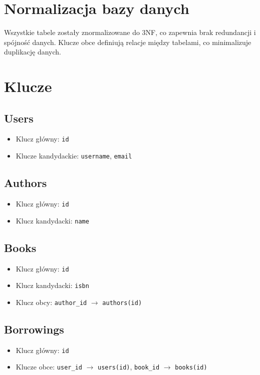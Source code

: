 \documentclass{article}
\begin{document}
\section*{Normalizacja bazy danych}
Wszystkie tabele zostały znormalizowane do 3NF, co zapewnia brak redundancji i spójność danych. Klucze obce definiują relacje między tabelami, co minimalizuje duplikację danych.

\section*{Klucze}
\subsection*{Users}
\begin{itemize}
    \item Klucz główny: \texttt{id}
    \item Klucze kandydackie: \texttt{username}, \texttt{email}
\end{itemize}

\subsection*{Authors}
\begin{itemize}
    \item Klucz główny: \texttt{id}
    \item Klucz kandydacki: \texttt{name}
\end{itemize}

\subsection*{Books}
\begin{itemize}
    \item Klucz główny: \texttt{id}
    \item Klucz kandydacki: \texttt{isbn}
    \item Klucz obcy: \texttt{author\_id} \(\rightarrow\) \texttt{authors(id)}
\end{itemize}

\subsection*{Borrowings}
\begin{itemize}
    \item Klucz główny: \texttt{id}
    \item Klucze obce: \texttt{user\_id} \(\rightarrow\) \texttt{users(id)}, \texttt{book\_id} \(\rightarrow\) \texttt{books(id)}
\end{itemize}
\end{document}
